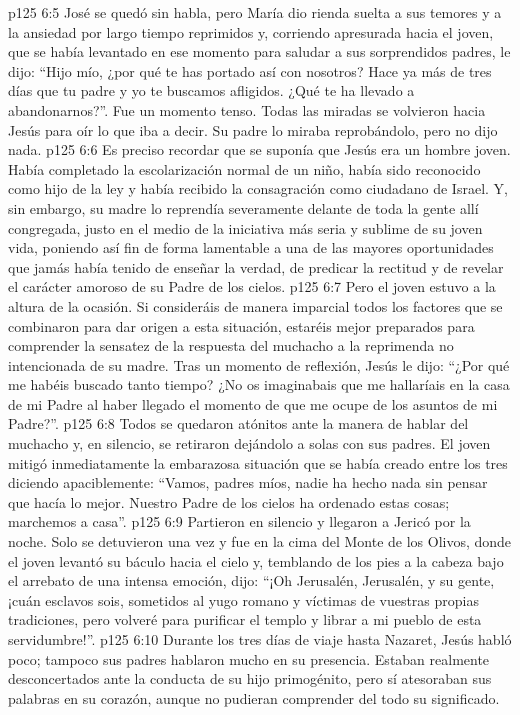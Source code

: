 \vs p125 6:5 José se quedó sin habla, pero María dio rienda suelta a sus temores y a la ansiedad por largo tiempo reprimidos y, corriendo apresurada hacia el joven, que se había levantado en ese momento para saludar a sus sorprendidos padres, le dijo: “Hijo mío, ¿por qué te has portado así con nosotros? Hace ya más de tres días que tu padre y yo te buscamos afligidos. ¿Qué te ha llevado a abandonarnos?”. Fue un momento tenso. Todas las miradas se volvieron hacia Jesús para oír lo que iba a decir. Su padre lo miraba reprobándolo, pero no dijo nada.
\vs p125 6:6 \pc Es preciso recordar que se suponía que Jesús era un hombre joven. Había completado la escolarización normal de un niño, había sido reconocido como hijo de la ley y había recibido la consagración como ciudadano de Israel. Y, sin embargo, su madre lo reprendía severamente delante de toda la gente allí congregada, justo en el medio de la iniciativa más seria y sublime de su joven vida, poniendo así fin de forma lamentable a una de las mayores oportunidades que jamás había tenido de enseñar la verdad, de predicar la rectitud y de revelar el carácter amoroso de su Padre de los cielos.
\vs p125 6:7 Pero el joven estuvo a la altura de la ocasión. Si consideráis de manera imparcial todos los factores que se combinaron para dar origen a esta situación, estaréis mejor preparados para comprender la sensatez de la respuesta del muchacho a la reprimenda no intencionada de su madre. Tras un momento de reflexión, Jesús le dijo: “¿Por qué me habéis buscado tanto tiempo? ¿No os imaginabais que me hallaríais en la casa de mi Padre al haber llegado el momento de que me ocupe de los asuntos de mi Padre?”.
\vs p125 6:8 Todos se quedaron atónitos ante la manera de hablar del muchacho y, en silencio, se retiraron dejándolo a solas con sus padres. El joven mitigó inmediatamente la embarazosa situación que se había creado entre los tres diciendo apaciblemente: “Vamos, padres míos, nadie ha hecho nada sin pensar que hacía lo mejor. Nuestro Padre de los cielos ha ordenado estas cosas; marchemos a casa”.
\vs p125 6:9 Partieron en silencio y llegaron a Jericó por la noche. Solo se detuvieron una vez y fue en la cima del Monte de los Olivos, donde el joven levantó su báculo hacia el cielo y, temblando de los pies a la cabeza bajo el arrebato de una intensa emoción, dijo: “¡Oh Jerusalén, Jerusalén, y su gente, ¡cuán esclavos sois, sometidos al yugo romano y víctimas de vuestras propias tradiciones, pero volveré para purificar el templo y librar a mi pueblo de esta servidumbre!”.
\vs p125 6:10 Durante los tres días de viaje hasta Nazaret, Jesús habló poco; tampoco sus padres hablaron mucho en su presencia. Estaban realmente desconcertados ante la conducta de su hijo primogénito, pero sí atesoraban sus palabras en su corazón, aunque no pudieran comprender del todo su significado.
